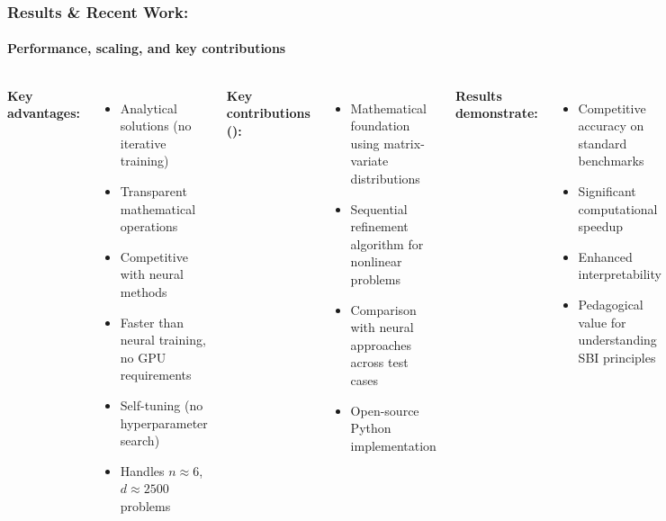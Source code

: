 \documentclass[aspectratio=169]{beamer}
\begin{document}
\begin{frame}
    \frametitle{Results \& Recent Work: }
    \framesubtitle{Performance, scaling, and key contributions}
    \begin{columns}
        \textbf{Key advantages:}
        \begin{itemize}
            \item Analytical solutions (no iterative training)
            \item Transparent mathematical operations
            \item Competitive with neural methods
            \item Faster than neural training, no GPU requirements
            \item Self-tuning (no hyperparameter search)
            \item Handles $n \approx 6$, $d \approx 2500$ problems
        \end{itemize}
        
        \textbf{Key contributions ():}
        \begin{itemize}
            \item Mathematical foundation using matrix-variate distributions
            \item Sequential refinement algorithm for nonlinear problems
            \item Comparison with neural approaches across test cases
            \item Open-source Python implementation
        \end{itemize}

        \textbf{Results demonstrate:}
        \begin{itemize}
            \item Competitive accuracy on standard benchmarks
            \item Significant computational speedup
            \item Enhanced interpretability 
            \item Pedagogical value for understanding SBI principles
        \end{itemize}
        
        \textbf{Available at:}
        \begin{itemize}
            \item {}
            \item {}
        \end{itemize}
        
        \vspace{0.5cm}
        \textbf{Master's student project} led to comprehensive framework paper with practical applications in cosmology and beyond.
    \end{columns}
\end{frame}
\end{document}
